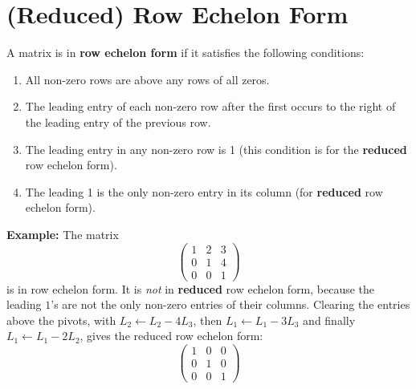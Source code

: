 \documentclass[]{article}
\begin{document}
	\section{(Reduced) Row Echelon Form}
	
	A matrix is in \textbf{row echelon form} if it satisfies the following conditions:
	\begin{enumerate}
		\item All non-zero rows are above any rows of all zeros.
		\item The leading entry of each non-zero row after the first occurs to the right of the leading entry of the previous row.
		\item The leading entry in any non-zero row is 1 (this condition is for the \textbf{reduced} row echelon form).
		\item The leading 1 is the only non-zero entry in its column (for \textbf{reduced} row echelon form).
	\end{enumerate}
	
	\textbf{Example:} The matrix
	$$
	\begin{pmatrix}
		1 & 2 & 3 \\
		0 & 1 & 4 \\
		0 & 0 & 1
	\end{pmatrix}
	$$
	is in row echelon form.
	It is \textit{not} in \textbf{reduced} row echelon form, because the leading $1$'s are not the only non-zero entries of their columns.
	Clearing the entries above the pivots, with $L_2 \leftarrow L_2 - 4L_3$, then $L_1 \leftarrow L_1 - 3L_3$ and finally $L_1 \leftarrow L_1 - 2L_2$, gives the reduced row echelon form:
	$$
	\begin{pmatrix}
		1 & 0 & 0 \\
		0 & 1 & 0 \\
		0 & 0 & 1
	\end{pmatrix}
	$$
\end{document}
